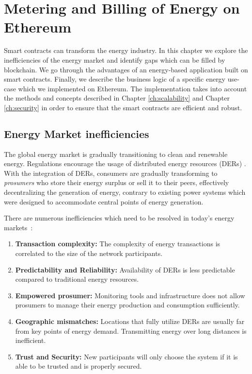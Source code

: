 \chapter{Metering and Billing of Energy on Ethereum}\label{ch:implementation}

Smart contracts can transform the energy industry. In this chapter we explore the inefficiencies of the energy market and identify gaps which can be filled by blockchain. We go through the advantages of an energy-based application built on smart contracts. Finally, we describe the business logic of a specific energy use-case which we implemented on Ethereum. The implementation takes into account the methods and concepts described in Chapter \ref{ch:scalability} and Chapter \ref{ch:security} in order to ensure that the smart contracts are efficient and robust.


\section{Energy Market inefficiencies}

The global energy market is gradually transitioning to clean and renewable energy. Regulations encourage the usage of distributed energy resources (DERs) \cite{europe2030}. With the integration of DERs, consumers are gradually transforming to \textit{prosumers} who store their energy surplus or sell it to their peers, effectively decentralizing the generation of energy, contrary to existing power systems which were designed to accommodate central points of energy generation.

There are numerous inefficiencies which need to be resolved in today's energy markets~\cite{ey-inefficiencies}:
\begin{enumerate}
    \item \textbf{Transaction complexity:} The complexity of energy transactions is correlated to the size of the network participants.
    \item \textbf{Predictability and Reliability:} Availability of DERs is less predictable compared to traditional energy resources.
    \item \textbf{Empowered prosumer:} Monitoring tools and infrastructure does not allow prosumers to manage their energy production and consumption sufficiently.
    \item \textbf{Geographic mismatches:} Locations that fully utilize DERs are usually far from key points of energy demand. Transmitting energy over long distances is inefficient.
    \item \textbf{Trust and Security:} New participants will only choose the system if it is able to be trusted and is properly secured.
\end{enumerate}

